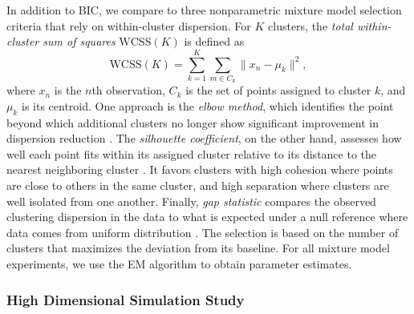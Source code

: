In addition to BIC, we compare \methodname to three nonparametric mixture model selection criteria that rely on within-cluster dispersion. 
For $K$ clusters, the \emph{total within-cluster sum of squares} $\mathrm{WCSS}(K)$ is defined as
\[
    \mathrm{WCSS}(K) = \sum_{k=1}^{K} \sum_{m \in C_k} \| x_n - \mu_k \|^2,
\]
where $x_n$ is the $n$th observation, $C_k$ is the set of points assigned to cluster $k$, 
and $\mu_k$ is its centroid. 
One approach is the \emph{elbow method}, which identifies the point beyond which additional clusters no longer show significant improvement in dispersion reduction \citep{Thorndike_1953} . 
The \emph{silhouette coefficient}, on the other hand, assesses how well each point fits within its assigned cluster relative to its distance to the nearest neighboring cluster \citep{siluet_coef}. It favors clusters with high cohesion where points are close to others in the same cluster, and high separation where clusters are well isolated from one another. 
Finally, \emph{gap statistic} compares the observed clustering dispersion in the data to what is expected under a null reference where data comes from uniform distribution \citep{gap_stats}. The selection is based on the number of clusters that maximizes the deviation from its baseline. 
For all mixture model experiments, we use the EM algorithm to obtain parameter estimates.


\subsubsection{High Dimensional Simulation Study}
\label{sec:high-dim-simulation}

